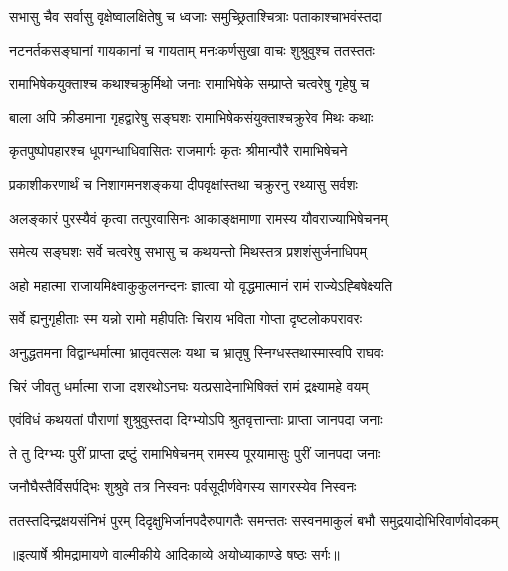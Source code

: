 \twolineshloka
{सभासु चैव सर्वासु वृक्षेष्वालक्षितेषु च}
{ध्वजाः समुच्छ्रिताश्चित्राः पताकाश्चाभवंस्तदा} %

\twolineshloka
{नटनर्तकसङ्घानां गायकानां च गायताम्}
{मनःकर्णसुखा वाचः शुश्रुवुश्च ततस्ततः} %

\twolineshloka
{रामाभिषेकयुक्ताश्च कथाश्चक्रुर्मिथो जनाः}
{रामाभिषेके सम्प्राप्ते चत्वरेषु गृहेषु च} %

\twolineshloka
{बाला अपि क्रीडमाना गृहद्वारेषु सङ्घशः}
{रामाभिषेकसंयुक्ताश्चक्रुरेव मिथः कथाः} %

\twolineshloka
{कृतपुष्पोपहारश्च धूपगन्धाधिवासितः}
{राजमार्गः कृतः श्रीमान्पौरै रामाभिषेचने} %

\twolineshloka
{प्रकाशीकरणार्थं च निशागमनशङ्कया}
{दीपवृक्षांस्तथा चक्रुरनु रथ्यासु सर्वशः} %

\twolineshloka
{अलङ्कारं पुरस्यैवं कृत्वा तत्पुरवासिनः}
{आकाङ्क्षमाणा रामस्य यौवराज्याभिषेचनम्} %

\twolineshloka
{समेत्य सङ्घशः सर्वे चत्वरेषु सभासु च}
{कथयन्तो मिथस्तत्र प्रशशंसुर्जनाधिपम्} %

\twolineshloka
{अहो महात्मा राजायमिक्ष्वाकुकुलनन्दनः}
{ज्ञात्वा यो वृद्धमात्मानं रामं राज्येऽह्बिषेक्ष्यति} %

\twolineshloka
{सर्वे ह्यनुगृहीताः स्म यन्नो रामो महीपतिः}
{चिराय भविता गोप्ता दृष्टलोकपरावरः} %

\twolineshloka
{अनुद्धतमना विद्वान्धर्मात्मा भ्रातृवत्सलः}
{यथा च भ्रातृषु स्निग्धस्तथास्मास्वपि राघवः} %

\twolineshloka
{चिरं जीवतु धर्मात्मा राजा दशरथोऽनघः}
{यत्प्रसादेनाभिषिक्तं रामं द्रक्ष्यामहे वयम्} %

\twolineshloka
{एवंविधं कथयतां पौराणां शुश्रुवुस्तदा}
{दिग्भ्योऽपि श्रुतवृत्तान्ताः प्राप्ता जानपदा जनाः} %

\twolineshloka
{ते तु दिग्भ्यः पुरीं प्राप्ता द्रष्टुं रामाभिषेचनम्}
{रामस्य पूरयामासुः पुरीं जानपदा जनाः} %

\twolineshloka
{जनौघैस्तैर्विसर्पद्भिः शुश्रुवे तत्र निस्वनः}
{पर्वसूदीर्णवेगस्य सागरस्येव निस्वनः} %

\fourlineindentedshloka
{ततस्तदिन्द्रक्षयसंनिभं पुरम्}
{दिदृक्षुभिर्जानपदैरुपागतैः}
{समन्ततः सस्वनमाकुलं बभौ}
{समुद्रयादोभिरिवार्णवोदकम्} %


{॥इत्यार्षे श्रीमद्रामायणे वाल्मीकीये आदिकाव्ये अयोध्याकाण्डे षष्ठः सर्गः॥}


